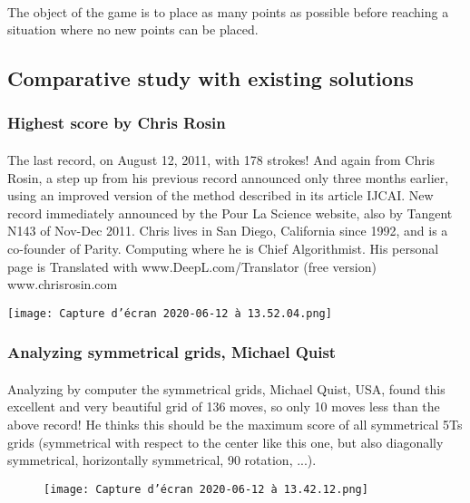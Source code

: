 \documentclass{article}
\begin{document}
\paragraph{}
\setlength{\parindent}{2cm}
The object of the game is to place as many points as possible before reaching a situation where no new points can be placed.
~\cite{solitaire} 
\subsection{Comparative study with existing solutions}
\subsubsection{Highest score by Chris Rosin}
\paragraph{}
\setlength{\parindent}{2cm}
 The last record, on August 12, 2011, with 178 strokes! And again from
 Chris Rosin, a step up from his previous record announced
 only three months earlier, using an improved version of
 the method described in its article IJCAI. New record
 immediately announced by the Pour La Science website, also by
 Tangent N143 of Nov-Dec 2011. Chris lives in San Diego,
 California since 1992, and is a co-founder of Parity.
 Computing where he is Chief Algorithmist. His personal page is
Translated with www.DeepL.com/Translator (free version)
 www.chrisrosin.com
 ~\cite{score} 
\begin{center}
\centering
\texttt{[image: Capture d’écran 2020-06-12 à 13.52.04.png]}
\label{fig:ucp}\\%
\end{center}
\subsubsection{Analyzing symmetrical grids, Michael Quist}
\paragraph{}
\setlength{\parindent}{2cm}
Analyzing by computer the symmetrical grids, Michael Quist, USA, found this excellent and very beautiful grid of 136 moves, so only 10 moves less than the above record!
He thinks this should be the maximum score of all symmetrical 5Ts grids (symmetrical with respect to the center like this one, but also diagonally symmetrical, horizontally symmetrical, 90 rotation, ...).~\cite{chinois} 
\begin{figure}
\centering
\texttt{[image: Capture d’écran 2020-06-12 à 13.42.12.png]}
\end{figure}
\end{document}
